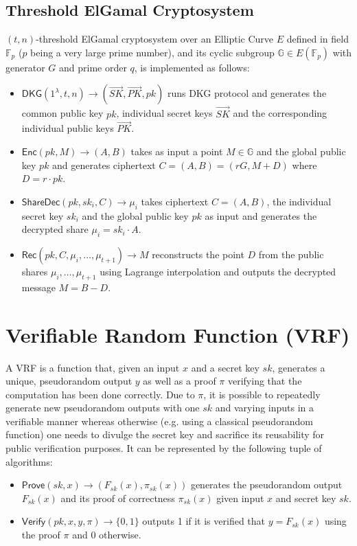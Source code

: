 \documentclass[letterpaper,twocolumn,10pt]{article}
\theoremstyle{definition}
\theoremstyle{remark}
\begin{document}
\subsection{Threshold ElGamal Cryptosystem}
\label{appendix:thrElGamal}
$(t, n)$-threshold ElGamal cryptosystem \cite{desmedt1990Threshold, cherniaeva2019homomorphic} over an Elliptic Curve $E$ defined in field $\mathbb{F}_p$ ($p$ being a very large prime number), and its cyclic subgroup $\mathbb{G} \in E(\mathbb{F}_p)$ with generator $G$ and prime order $q$, is implemented as follows:
\begin{itemize}
    \item $\mathsf{DKG}(1^\lambda, t, n) \rightarrow (\vec{SK}, \vec{PK}, pk)$ runs DKG protocol and generates the common public key $pk$, individual secret keys $\vec{SK}$ and the corresponding individual public keys $\vec{PK}$.
     \item $\mathsf{Enc}(pk, M) \rightarrow (A, B)$ takes as input a point $M \in \mathbb{G}$ and the global public key $pk$ and generates ciphertext $C = (A, B) = (rG, M+D) $ where $D = r \cdot pk$.
     \item $\mathsf{ShareDec}(pk, sk_i, C) \rightarrow \mu_i$ takes ciphertext $C = (A,B)$, the individual secret key $sk_i$ and the global public key $pk$ as input and generates the decrypted share $\mu_i = sk_i \cdot A$.
     \item $\mathsf{Rec}(pk, C, \mu_i, \ldots, \mu_{t + 1} ) \rightarrow M$ reconstructs the point $D$ from the public shares $\mu_i, \ldots, \mu_{t + 1}$ using Lagrange interpolation and outputs the decrypted message $M = B - D$.
\end{itemize}

\section{Verifiable Random Function (VRF)}
\label{appendix:vrf}
A VRF \cite{micali1999verifiable,dodis2005verifiable} is a function that, given an input $x$ and a secret key $sk$, generates a unique, pseudorandom output $y$ as well as a proof $\pi$ verifying that the computation has been done correctly. Due to $\pi$, it is possible to repeatedly generate new pseudorandom outputs with one $sk$ and varying inputs in a verifiable manner whereas otherwise (e.g. using a classical pseudorandom function) one needs to divulge the secret key and sacrifice its reusability for public verification purposes. It can be represented by the following tuple of algorithms:
\begin{itemize}
\item $\mathsf{Prove}(sk, x) \rightarrow (F_{sk}(x), \pi_{sk}(x))$ generates the pseudorandom output $F_{sk}(x)$ and its proof of correctness $\pi_{sk}(x)$ given input $x$ and secret key $sk$.
\item $\mathsf{Verify}(pk, x, y, \pi) \rightarrow \{0, 1\}$ outputs 1 if it is verified that $y = F_{sk}(x)$ using the proof $\pi$ and 0 otherwise.
\end{itemize}
\end{document}
